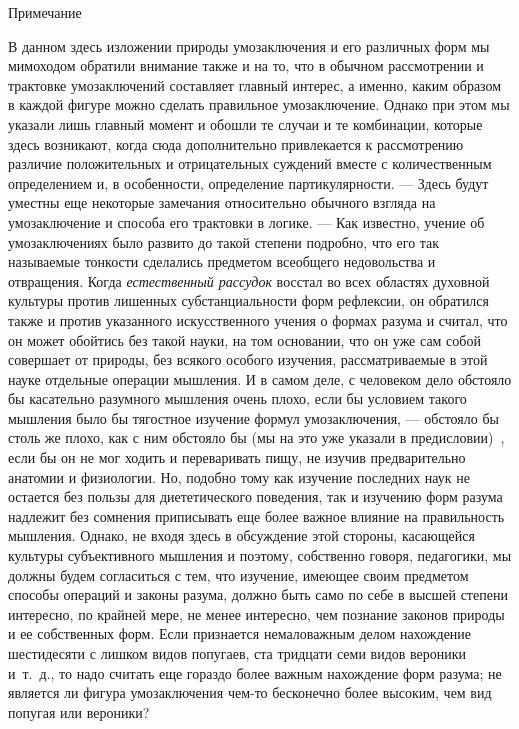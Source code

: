 \documentclass[twoside]{article}
\begin{document}
{{{{{{\centering
Примечание
\newline
{}
\par}

В данном здесь изложении природы умозаключения и его различных
форм мы мимоходом обратили внимание также и на то, что в обычном
рассмотрении и трактовке умозаключений составляет главный
интерес, а именно, каким образом в каждой фигуре можно сделать правильное
умозаключение. Однако при этом мы указали лишь главный момент и обошли те
случаи и те комбинации, которые здесь возникают, когда сюда дополнительно
привлекается к рассмотрению различие положительных и отрицательных суждений
вместе с количественным определением и, в особенности, определение
партикулярности. — Здесь будут уместны еще некоторые
замечания относительно обычного взгляда на умозаключение и способа его
трактовки в логике. — Как известно, учение об умозаключениях
было развито до такой степени подробно, что его так называемые тонкости
сделались предметом всеобщего недовольства и отвращения. Когда
{\em естественный рассудок}
восстал во всех областях духовной культуры против лишенных
субстанциальности форм рефлексии, он обратился также и против указанного
искусственного учения о формах разума и считал, что он может обойтись без
такой науки, на том основании, что он уже сам собой совершает от природы,
без всякого особого изучения, рассматриваемые в этой науке отдельные
операции мышления. И в самом деле, с человеком дело обстояло бы касательно
разумного мышления очень плохо, если бы условием такого мышления было бы
тягостное изучение формул умозаключения, — обстояло бы столь
же плохо, как с ним обстояло бы (мы на это уже указали в
предисловии)~\label{bkm:bm55},
если бы он не мог ходить и переваривать пищу, не изучив
предварительно анатомии и физиологии. Но, подобно тому как изучение
последних наук не остается без пользы для диететического поведения, так и
изучению форм разума надлежит без сомнения приписывать еще более важное
влияние на правильность мышления. Однако, не входя здесь в обсуждение этой
стороны, касающейся культуры субъективного мышления и поэтому, собственно
говоря, педагогики, мы должны будем согласиться с тем, что изучение,
имеющее своим предметом способы операций и законы разума, должно быть само
по себе в высшей степени интересно, по крайней мере, не менее интересно,
чем познание законов природы и ее собственных форм. Если признается
немаловажным делом нахождение шестидесяти с лишком видов попугаев, ста
тридцати семи видов вероники и~т.~д., то надо считать еще гораздо более
важным нахождение форм разума; не является ли фигура умозаключения чем-то
бесконечно более высоким, чем вид попугая или вероники?

}}}}}
\end{document}
